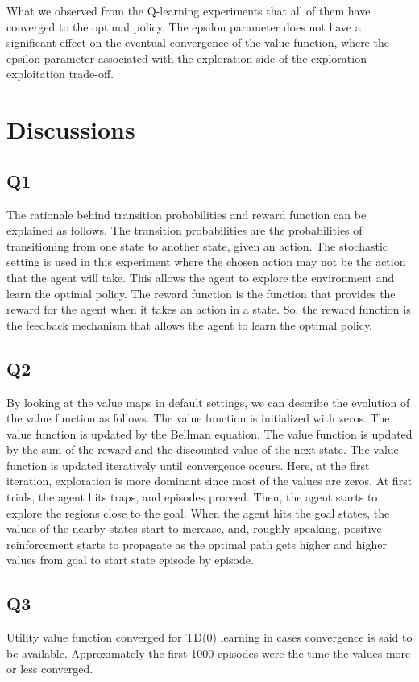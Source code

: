 \documentclass{assignment}
\begin{document}
What we observed from the Q-learning experiments that all of them have converged to the optimal policy. The epsilon parameter does not have a significant effect on the eventual convergence of the value function, where the epsilon parameter associated with the exploration side of the exploration-exploitation trade-off. 





\section{Discussions}
\subsection{Q1}
The rationale behind transition probabilities and reward function can be explained as follows. The transition probabilities are the probabilities of transitioning from one state to another state, given an action. The stochastic setting is used in this experiment where the chosen action may not be the action that the agent will take. This allows the agent to explore the environment and learn the optimal policy. The reward function is the function that provides the reward for the agent when it takes an action in a state. So, the reward function is the feedback mechanism that allows the agent to learn the optimal policy.
\subsection{Q2}
By looking at the value maps in default settings, we can describe the evolution of the value function as follows. The value function is initialized with zeros. The value function is updated by the Bellman equation. The value function is updated by the sum of the reward and the discounted value of the next state. The value function is updated iteratively until convergence occurs. Here, at the first iteration, exploration is more dominant since most of the values are zeros. At first trials, the agent hits traps, and episodes proceed. Then, the agent starts to explore the regions close to the goal. When the agent hits the goal states, the values of the nearby states start to increase, and, roughly speaking, positive reinforcement starts to propagate as the optimal path gets higher and higher values from goal to start state episode by episode. 
\subsection{Q3}
Utility value function converged for TD(0) learning in cases convergence is said to be available. Approximately the first 1000 episodes were the time the values more or less converged.
\end{document}
